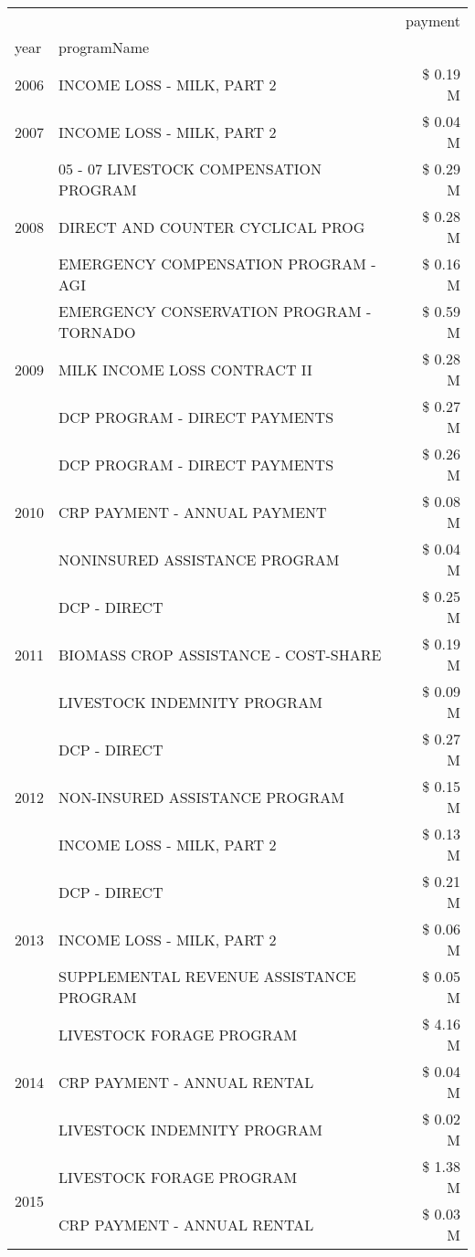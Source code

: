 \begin{tabular}{llr}
\toprule
 &  & payment \\
year & programName &  \\
\midrule
2006 & INCOME LOSS - MILK, PART 2 & \$ 0.19 M \\
\cline{1-3}
2007 & INCOME LOSS - MILK, PART 2 & \$ 0.04 M \\
\cline{1-3}
\multirow[t]{3}{*}{2008} & 05 - 07 LIVESTOCK COMPENSATION PROGRAM & \$ 0.29 M \\
 & DIRECT AND COUNTER CYCLICAL PROG & \$ 0.28 M \\
 & EMERGENCY COMPENSATION PROGRAM - AGI & \$ 0.16 M \\
\cline{1-3}
\multirow[t]{3}{*}{2009} & EMERGENCY CONSERVATION PROGRAM - TORNADO & \$ 0.59 M \\
 & MILK INCOME LOSS CONTRACT II & \$ 0.28 M \\
 & DCP PROGRAM - DIRECT PAYMENTS & \$ 0.27 M \\
\cline{1-3}
\multirow[t]{3}{*}{2010} & DCP PROGRAM - DIRECT PAYMENTS & \$ 0.26 M \\
 & CRP PAYMENT - ANNUAL PAYMENT & \$ 0.08 M \\
 & NONINSURED ASSISTANCE PROGRAM & \$ 0.04 M \\
\cline{1-3}
\multirow[t]{3}{*}{2011} & DCP - DIRECT & \$ 0.25 M \\
 & BIOMASS CROP ASSISTANCE - COST-SHARE & \$ 0.19 M \\
 & LIVESTOCK INDEMNITY PROGRAM & \$ 0.09 M \\
\cline{1-3}
\multirow[t]{3}{*}{2012} & DCP - DIRECT & \$ 0.27 M \\
 & NON-INSURED ASSISTANCE PROGRAM & \$ 0.15 M \\
 & INCOME LOSS - MILK, PART 2 & \$ 0.13 M \\
\cline{1-3}
\multirow[t]{3}{*}{2013} & DCP - DIRECT & \$ 0.21 M \\
 & INCOME LOSS - MILK, PART 2 & \$ 0.06 M \\
 & SUPPLEMENTAL REVENUE ASSISTANCE PROGRAM & \$ 0.05 M \\
\cline{1-3}
\multirow[t]{3}{*}{2014} & LIVESTOCK FORAGE PROGRAM & \$ 4.16 M \\
 & CRP PAYMENT - ANNUAL RENTAL & \$ 0.04 M \\
 & LIVESTOCK INDEMNITY PROGRAM & \$ 0.02 M \\
\cline{1-3}
\multirow[t]{3}{*}{2015} & LIVESTOCK FORAGE PROGRAM & \$ 1.38 M \\
 & CRP PAYMENT - ANNUAL RENTAL & \$ 0.03 M \\

\end{tabular}
